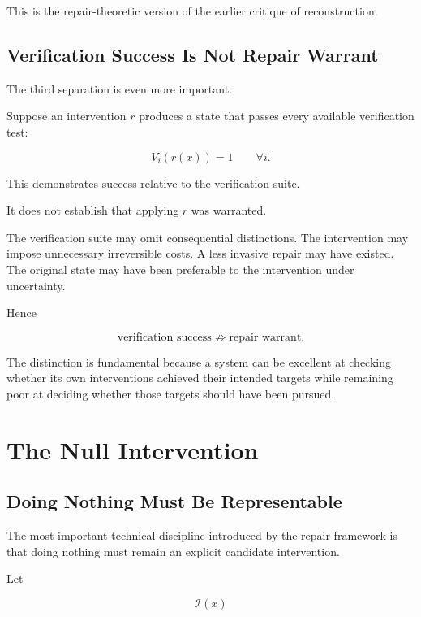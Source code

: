 \documentclass[11pt]{article}
\theoremstyle{remark}
\begin{document}
This is the repair-theoretic version of the earlier critique of reconstruction.

\subsection{Verification Success Is Not Repair Warrant}

The third separation is even more important.

Suppose an intervention $r$ produces a state that passes every available verification test:

\begin{equation}
V_i(r(x))=1
\qquad
\forall i.
\end{equation}

This demonstrates success relative to the verification suite.

It does not establish that applying $r$ was warranted.

The verification suite may omit consequential distinctions. The intervention may impose unnecessary irreversible costs. A less invasive repair may have existed. The original state may have been preferable to the intervention under uncertainty.

Hence

\begin{equation}
\boxed{
\text{verification success}
\not\Rightarrow
\text{repair warrant}.
}
\end{equation}

The distinction is fundamental because a system can be excellent at checking whether its own interventions achieved their intended targets while remaining poor at deciding whether those targets should have been pursued.

\section{The Null Intervention}

\subsection{Doing Nothing Must Be Representable}

The most important technical discipline introduced by the repair framework is that doing nothing must remain an explicit candidate intervention.

Let

\begin{equation}
\mathcal{I}(x)
\end{equation}
\end{document}
